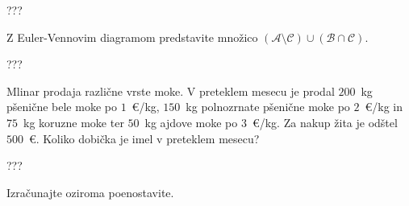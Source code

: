 \documentclass[addpoints]{exam}
\begin{document}
\begin{questions}

    \begin{solution}[8cm]
        ???
            \end{solution}




    \newpage
    \question[2]
    Z Euler-Vennovim diagramom predstavite množico $(\mathcal{A}\setminus\mathcal{C})\cup(\mathcal{B}\cap\mathcal{C})$.
    
    \begin{solution}[5cm]
        ???
            \end{solution}
        
    \question[3]
    Mlinar prodaja različne vrste moke. V preteklem mesecu je prodal $200$~kg pšenične bele moke po $1$~\euro/kg, $150$~kg polnozrnate pšenične moke po $2$~\euro/kg in 
    $75$~kg koruzne moke ter $50$~kg ajdove moke po $3$~\euro/kg. Za nakup žita je odštel $500$~\euro. Koliko dobička je imel v preteklem mesecu?

    \begin{solution}[5cm]
        ???
            \end{solution}


    \question
    Izračunajte oziroma poenostavite.

    

\end{questions}
\end{document}
